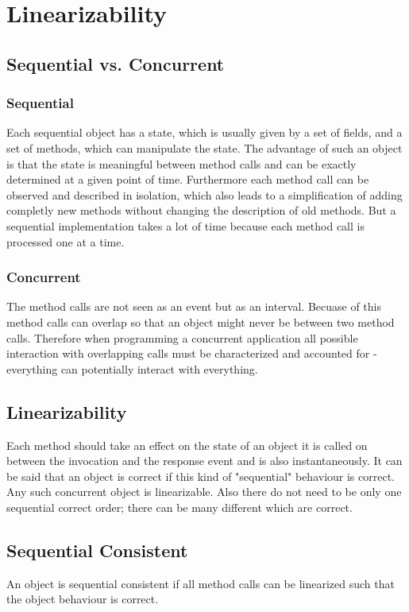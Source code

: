 \documentclass{article}
\begin{document}
	\section{Linearizability}
	\begin{adjustwidth}{2em}{2em}
		\subsection{Sequential vs. Concurrent}
		\begin{adjustwidth}{2em}{2em}
			\subsubsection{Sequential}
			\begin{adjustwidth}{1em}{}
				Each sequential object has a state, which is usually given by a set of fields, and a set of methods, which can manipulate the state. The advantage of such an object is that the state is meaningful between method calls and can be exactly determined at a given point of time. Furthermore each method call can be observed and described in isolation, which also leads to a simplification of adding completly new methods without changing the description of old methods. But a sequential implementation takes a lot of time because each method call is processed one at a time.
			\end{adjustwidth}
			\subsubsection{Concurrent}
			\begin{adjustwidth}{1em}{}
				The method calls are not seen as an event but as an interval. Becuase of this method calls can overlap so that an object might never be between two method calls. Therefore when programming a concurrent application all possible interaction with overlapping calls must be characterized and accounted for - everything can potentially interact with everything.
			\end{adjustwidth}
		\end{adjustwidth}
		\subsection{Linearizability}
		\begin{adjustwidth}{2em}{2em}
			Each method should take an effect on the state of an object it is called on between the invocation and the response event and is also instantaneously. It can be said that an object is correct if this kind of "sequential" behaviour is correct. Any such concurrent object is linearizable. Also there do not need to be only one sequential correct order; there can be many different which are correct.
		\end{adjustwidth}
		\subsection{Sequential Consistent}
		\begin{adjustwidth}{2em}{2em}
			An object is sequential consistent if all method calls can be linearized such that the object behaviour is correct.
		\end{adjustwidth}
	\end{adjustwidth}
\end{document}
